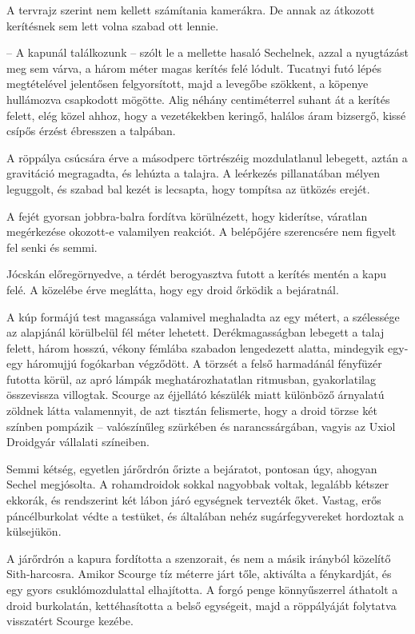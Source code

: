 \documentclass{thesis-ekf}
\theoremstyle{definition}
\begin{document}
A tervrajz szerint nem kellett számítania kamerákra. De annak az átkozott kerítésnek sem lett
volna szabad ott lennie.

-- A kapunál találkozunk -- szólt le a mellette hasaló Sechelnek, azzal a nyugtázást meg sem
várva, a három méter magas kerítés felé lódult. Tucatnyi futó lépés megtételével jelentősen
felgyorsított, majd a levegőbe szökkent, a köpenye hullámozva csapkodott mögötte. Alig
néhány centiméterrel suhant át a kerítés felett, elég közel ahhoz, hogy a vezetékekben keringő,
halálos áram bizsergő, kissé csípős érzést ébresszen a talpában.

A röppálya csúcsára érve a másodperc törtrészéig mozdulatlanul lebegett, aztán a gravitáció
megragadta, és lehúzta a talajra. A leérkezés pillanatában mélyen leguggolt, és szabad bal
kezét is lecsapta, hogy tompítsa az ütközés erejét.

A fejét gyorsan jobbra-balra fordítva körülnézett, hogy kiderítse, váratlan megérkezése
okozott-e valamilyen reakciót. A belépőjére szerencsére nem figyelt fel senki és semmi.

Jócskán előregörnyedve, a térdét berogyasztva futott a kerítés mentén a kapu felé. A
közelébe érve meglátta, hogy egy droid őrködik a bejáratnál.

A kúp formájú test magassága valamivel meghaladta az egy métert, a szélessége az
alapjánál körülbelül fél méter lehetett. Derékmagasságban lebegett a talaj felett, három hosszú,
vékony fémlába szabadon lengedezett alatta, mindegyik egy-egy háromujjú fogókarban
végződött. A törzsét a felső harmadánál fényfüzér futotta körül, az apró lámpák
meghatározhatatlan ritmusban, gyakorlatilag összevissza villogtak. Scourge az éjjellátó készülék
miatt különböző árnyalatú zöldnek látta valamennyit, de azt tisztán felismerte, hogy a droid
törzse két színben pompázik -- valószínűleg szürkében és narancssárgában, vagyis az Uxiol
Droidgyár vállalati színeiben.

Semmi kétség, egyetlen járőrdrón őrizte a bejáratot, pontosan úgy, ahogyan Sechel
megjósolta. A rohamdroidok sokkal nagyobbak voltak, legalább kétszer ekkorák, és rendszerint
két lábon járó egységnek tervezték őket. Vastag, erős páncélburkolat védte a testüket, és
általában nehéz sugárfegyvereket hordoztak a külsejükön.

A járőrdrón a kapura fordította a szenzorait, és nem a másik irányból közelítő Sith-harcosra.
Amikor Scourge tíz méterre járt tőle, aktiválta a fénykardját, és egy gyors csuklómozdulattal
elhajította. A forgó penge könnyűszerrel áthatolt a droid burkolatán, kettéhasította a belső
egységeit, majd a röppályáját folytatva visszatért Scourge kezébe.
\end{document}
